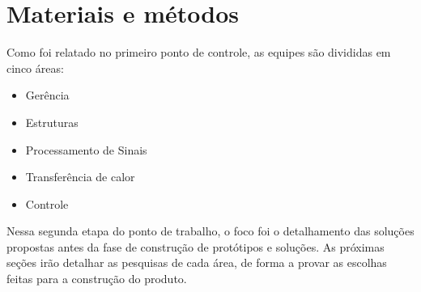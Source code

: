 \chapter{Materiais e métodos}

Como foi relatado no primeiro ponto de controle, as equipes são divididas em cinco áreas:
\begin{itemize}
\item Gerência
\item Estruturas
\item Processamento de Sinais
\item Transferência de calor
\item Controle
\end{itemize}

Nessa segunda etapa do ponto de trabalho, o foco foi o detalhamento das soluções propostas antes da fase de construção de protótipos e soluções. As próximas seções irão detalhar as pesquisas de cada área, de forma a provar as escolhas feitas para a construção do produto.
